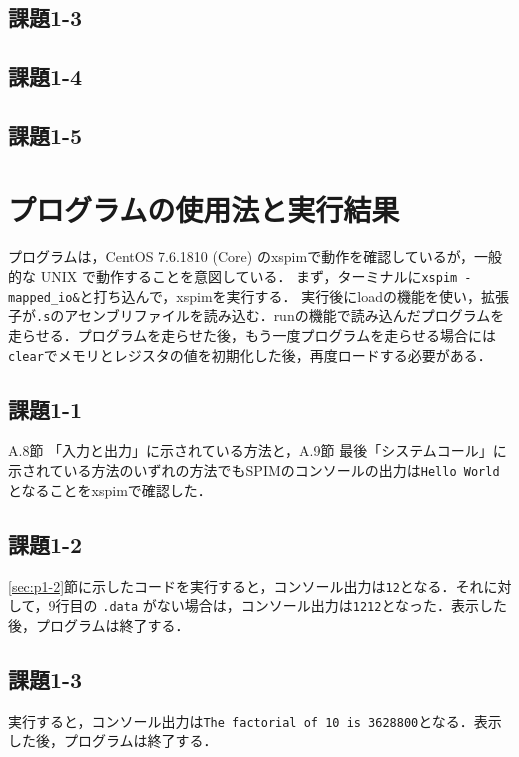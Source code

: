\subsection{課題1-3}


\subsection{課題1-4}


\subsection{課題1-5}



\section{プログラムの使用法と実行結果}\label{sec:howresult}

プログラムは，CentOS 7.6.1810 (Core) のxspimで動作を確認しているが，一般的な UNIX で動作することを意図している．
まず，ターミナルに\verb|xspim -mapped_io&|と打ち込んで，xspimを実行する．
実行後にloadの機能を使い，拡張子が\verb|.s|のアセンブリファイルを読み込む．runの機能で読み込んだプログラムを走らせる．プログラムを走らせた後，もう一度プログラムを走らせる場合には\verb|clear|でメモリとレジスタの値を初期化した後，再度ロードする必要がある．

\subsection{課題1-1}
A.8節 「入力と出力」に示されている方法と，A.9節 最後「システムコール」に示されている方法のいずれの方法でもSPIMのコンソールの出力は\verb|Hello World|となることをxspimで確認した．
\subsection{課題1-2}
\ref{sec:p1-2}節に示したコードを実行すると，コンソール出力は\verb|12|となる．それに対して，9行目の \verb|.data| がない場合は，コンソール出力は\verb|1212|となった．表示した後，プログラムは終了する．

\subsection{課題1-3}
実行すると，コンソール出力は\verb|The factorial of 10 is 3628800|となる．表示した後，プログラムは終了する．

